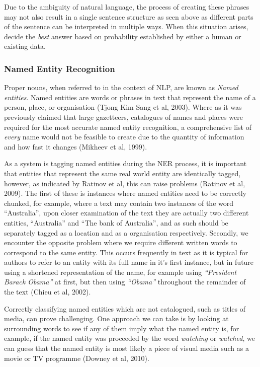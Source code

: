 \documentclass[12pt,a4paper]{article}
\begin{document}
Due to the ambiguity of natural language, the process of creating these phrases may not also result in a single sentence structure as seen above as different parts of the sentence can be interpreted in multiple ways. When this situation arises, decide the \emph{best} answer based on probability established by either a human or existing data. \newline

\subsubsection{Named Entity Recognition}
Proper nouns, when referred to in the context of NLP, are known as \emph{Named entities}. Named entities are words or phrases in text that represent the name of a person, place, or organisation (Tjong Kim Sang et al, 2003). Where as it was previously claimed that large gazetteers, catalogues of names and places were required for the most accurate named entity recognition, a comprehensive list of \emph{every} name would not be feasible to create due to the quantity of information and how fast it changes (Mikheev et al, 1999). \newline

As a system is tagging named entities during the NER process, it is important that entities that represent the same real world entity are identically tagged, however, as indicated by Ratinov et al, this can raise problems (Ratinov et al, 2009). The first of these is instances where named entities need to be correctly chunked, for example, where a text may contain two instances of the word ``Australia'', upon closer examination of the text they are actually two different entities, ``Australia'' and ``The bank of Australia'', and as such should be separately tagged as a location and as a organisation respectively. Secondly, we encounter the opposite problem where we require different written words to correspond to the same entity. This occurs frequently in text as it is typical for authors to refer to an entity with its full name in it's first instance, but in future using a shortened representation of the name, for example using \emph{``President Barack Obama''} at first, but then using \emph{``Obama''} throughout the remainder of the text (Chieu et al, 2002). \newline

Correctly classifying named entities which are not catalogued, such as titles of media, can prove challenging. One approach we can take is by looking at surrounding words to see if any of them imply what the named entity is, for example, if the named entity was proceeded by the word \emph{watching} or \emph{watched}, we can guess that the named entity is most likely a piece of visual media such as a movie or TV programme (Downey et al, 2010).
\end{document}
